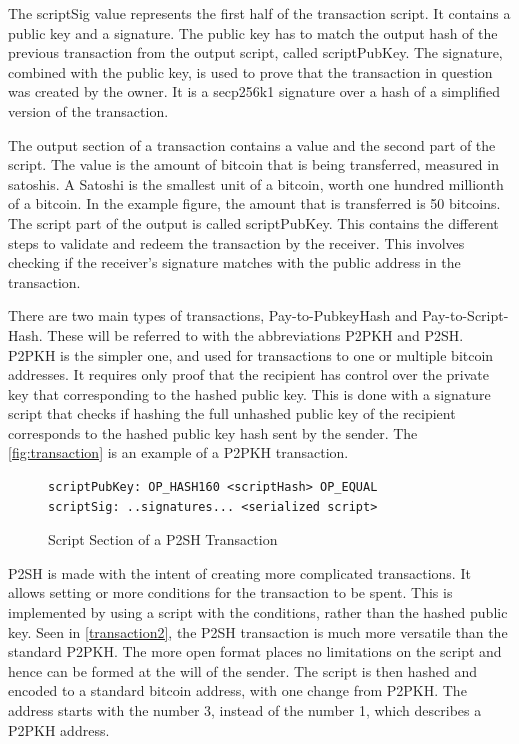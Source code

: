 \documentclass[12pt]{article}
\begin{document}
The scriptSig value represents the first half of the transaction script. It contains a public key and a signature. The public key has to match the output hash of the previous transaction from the output script, called scriptPubKey. The signature, combined with the public key, is used to prove that the transaction in question was created by the owner. It is a secp256k1 signature over a hash of a simplified version of the transaction. 

The output section of a transaction contains a value and the second part of the script. The value is the amount of bitcoin that is being transferred, measured in satoshis. A Satoshi is the smallest unit of a bitcoin, worth one hundred millionth of a bitcoin. In the example figure, the amount that is transferred is 50 bitcoins. The script part of the output is called scriptPubKey. This contains the different steps to validate and redeem the transaction by the receiver. This involves checking if the receiver's signature matches with the public address in the transaction. 

There are two main types of transactions, Pay-to-PubkeyHash and Pay-to-Script-Hash. These will be referred to with the abbreviations P2PKH and P2SH. P2PKH is the simpler one, and used for transactions to one or multiple bitcoin addresses. It requires only proof that the recipient has control over the private key that corresponding to the hashed public key. This is done with a signature script that checks if hashing the full unhashed public key of the recipient corresponds to the hashed public key hash sent by the sender. The \ref{fig:transaction} is an example of a P2PKH transaction. 
\begin{figure}[h!]
\begin{lstlisting}[numbers=none]
scriptPubKey: OP_HASH160 <scriptHash> OP_EQUAL 
scriptSig: ..signatures... <serialized script>
 \end{lstlisting}
 \caption{Script Section of a P2SH Transaction}
 \label{fig:transaction2}
\end{figure}

P2SH is made with the intent of creating more complicated transactions. It allows setting or more conditions for the transaction to be spent. This is implemented by using a script with the conditions, rather than the hashed public key. Seen in \ref{transaction2}, the P2SH transaction is much more versatile than the standard P2PKH. The more open format places no limitations on the script and hence can be formed at the will of the sender. The script is then hashed and encoded to a standard bitcoin address, with one change from P2PKH. The address starts with the number 3, instead of the number 1, which describes a P2PKH address. 
\end{document}
